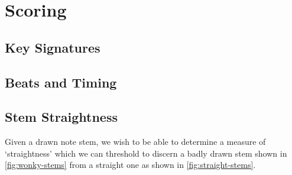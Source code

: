 \section{Scoring}

\subsection{Key Signatures}

\subsection{Beats and Timing}

\subsection{Stem Straightness}

Given a drawn note stem, we wish to be able to determine a measure of `straightness' which we can threshold to discern a badly drawn stem shown in \cref{fig:wonky-stems} from a straight one  as shown in \cref{fig:straight-stems}.

